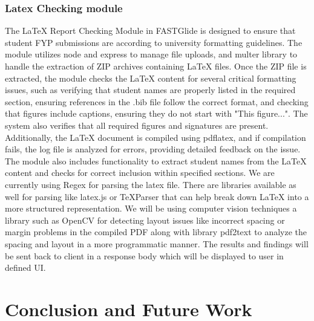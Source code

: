 \documentclass{FastFyp}
\begin{document}
\subsection{Latex Checking module}
The LaTeX Report Checking Module in FASTGlide is designed to ensure that student FYP submissions are according to university formatting guidelines. The module utilizes node and express to manage file uploads, and multer library to handle the extraction of ZIP archives containing LaTeX files. Once the ZIP file is extracted, the module checks the LaTeX content for several critical formatting issues, such as verifying that student names are properly listed in the required section, ensuring references in the .bib file follow the correct format, and checking that figures include captions, ensuring they do not start with "This figure...". The system also verifies that all required figures and signatures are present. Additionally, the LaTeX document is compiled using pdflatex, and if compilation fails, the log file is analyzed for errors, providing detailed feedback on the issue. The module also includes functionality to extract student names from the LaTeX content and checks for correct inclusion within specified sections. We are currently using Regex for parsing the latex file. There are libraries available as well for parsing like latex.js or TeXParser that can help break down LaTeX into a more structured representation. We will be using computer vision techniques a library such as OpenCV for detecting layout issues like incorrect spacing or margin problems in the compiled PDF along with library pdf2text to analyze the spacing and layout in a more programmatic manner. The results and findings will be sent back to client in a response body which will be displayed to user in defined UI.




\chapter{Conclusion and Future Work}
\end{document}
